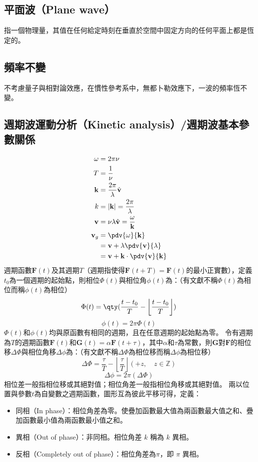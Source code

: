 \documentclass[a4paper,12pt]{report}
\begin{document}
\subsection{平面波（Plane wave）}
指一個物理量，其值在任何給定時刻在垂直於空間中固定方向的任何平面上都是恆定的。
\subsection{頻率不變}
不考慮量子與相對論效應，在慣性參考系中，無都卜勒效應下，一波的頻率恆不變。
\subsection{週期波運動分析（Kinetic analysis）/週期波基本參數關係}
\[\begin{aligned}
\omega &= 2\pi \nu \\
T &= \frac{1}{\nu} \\
\mathbf{k} &= \frac{2\pi}{\lambda}\hat{\mathbf{v}} \\
k &= |\mathbf{k}| = \frac{2\pi}{\lambda} \\
\mathbf{v} &= \nu \lambda \hat{\mathbf{v}} = \frac{\omega}{\mathbf{k}} \\
\mathbf{v}_g &= \pdv{\omega}{\mathbf{k}} \\
&= \mathbf{v}+\lambda \pdv{\mathbf{v}}{\lambda} \\
&= \mathbf{v}+\mathbf{k} \cdot\pdv{\mathbf{v}}{\mathbf{k}}
\end{aligned}\]
週期函數$\mathbf{F}(t)$及其週期$T$（週期指使得$\mathbf{F}(t+T)=\mathbf{F}(t)$的最小正實數），定義$t_0$為一個週期的起始點，則相位$\Phi(t)$與相位角$\phi (t)$為：（有文獻不稱$\Phi(t)$為相位而稱$\phi(t)$為相位）
\[\Phi(t)=\qty(\frac{t-t_0}{T}-\left\lfloor\frac{t-t_0}{T}\right\rfloor)\]
\[\phi(t)=2\pi\Phi(t)\]
$\Phi(t)$和$\phi(t)$均與原函數有相同的週期，且在任意週期的起始點為零。
令有週期為$T$的週期函數$\mathbf{F}(t)$和$\mathbf{G}(t)=\alpha \mathbf{F}(t+\tau)$，其中$\alpha$和$\tau$為常數，則$\mathbf{G}$對$\mathbf{F}$的相位移$\Delta\Phi$與相位角移$\Delta\phi$為：（有文獻不稱$\Delta\Phi$為相位移而稱$\Delta\phi$為相位移）
\[\Delta\Phi=\frac{\tau}{T}-\left\lfloor\frac{\tau}{T}\right\rfloor(+z,\quad z\in\mathbb{Z})\]
\[\Delta\phi=2\pi(\Delta\Phi)\]
相位差一般指相位移或其絕對值；相位角差一般指相位角移或其絕對值。
兩以位置與參數$t$為自變數之週期函數，圖形互為彼此平移可得，定義：
\begin{itemize}
\item 同相（In phase）：相位角差為零。使疊加函數最大值為兩函數最大值之和、疊加函數最小值為兩函數最小值之和。
\item 異相（Out of phase）：非同相。相位角差 $k$ 稱為 $k$ 異相。
\item 反相（Completely out of phase）：相位角差為$\pi$，即 $\pi$ 異相。
\end{itemize}
\end{document}
